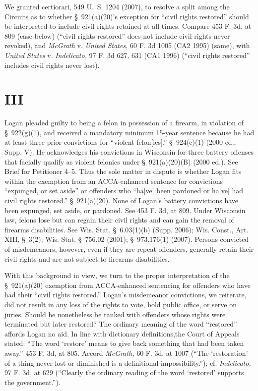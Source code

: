   We granted certiorari, 549 U.~S. 1204 (2007), to resolve a split among the Circuits as to whether \S~921(a)(20)'s exception for ``civil rights restored'' should be interpreted to include civil rights retained at all times. Compare 453 F. 3d, at 809 (case below) (``civil rights restored'' does not include civil rights never revoked), and \emph{McGrath} v. \emph{United States,} 60 F. 3d 1005 (CA2 1995) (same), with \emph{United States} v. \emph{Indelicato,} 97 F. 3d 627, 631 (CA1 1996) (``civil rights restored'' includes civil rights never lost).

\section{III}

  Logan pleaded guilty to being a felon in possession of a firearm, in violation of \S~922(g)(1), and received a mandatory minimum 15-year sentence because he had at least three prior convictions for ``violent felon[ies].'' \S~924(e)(1) (2000 ed., Supp. V). He acknowledges his convictions in Wisconsin for three battery offenses that facially qualify as violent felonies under \S~921(a)(20)(B) (2000 ed.). See Brief for Petitioner 4--5. Thus the sole matter in dispute is whether Logan fits within the exemption from an ACCA-enhanced sentence for convictions ``expunged, or set aside'' or offend\newpage ers who ``ha[ve] been pardoned or ha[ve] had civil rights restored.'' \S~921(a)(20). None of Logan's battery convictions have been expunged, set aside, or pardoned. See 453 F. 3d, at 809. Under Wisconsin law, felons lose but can regain their civil rights and can gain the removal of firearms disabilities. See Wis. Stat. \S~6.03(1)(b) (Supp. 2006); Wis. Const., Art. XIII, \S~3(2); Wis. Stat. \S~756.02 (2001); \S~973.176(1) (2007). Persons convicted of misdemeanors, however, even if they are repeat offenders, generally retain their civil rights and are not subject to firearms disabilities.

  With this background in view, we turn to the proper interpretation of the \S~921(a)(20) exemption from ACCA-enhanced sentencing for offenders who have had their ``civil rights restored.'' Logan's misdemeanor convictions, we reiterate, did not result in any loss of the rights to vote, hold public office, or serve on juries. Should he nonetheless be ranked with offenders whose rights were terminated but later restored? The ordinary meaning of the word ``restored'' affords Logan no aid. In line with dictionary definitions,\footnotemark[3] the Court of Appeals stated: ``The word ‘restore' means to give back something that had been taken away.'' 453 F. 3d, at 805. Accord \emph{McGrath,} 60 F. 3d, at 1007 (``The ‘restoration' of a thing never lost or diminished is a definitional impossibility.''); cf. \emph{Indelicato,} 97 F. 3d, at 629 (``Clearly the ordinary reading of the word ‘restored' supports the government.'').

